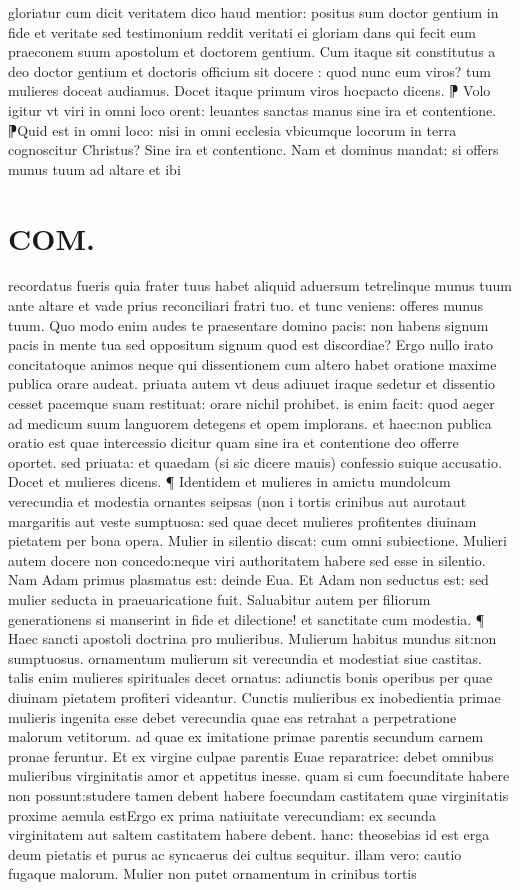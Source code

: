 \documentclass{article}
\begin{document}
\begin{pages}
gloriatur cum dicit veritatem dico haud mentior: positus sum doctor gentium in fide et veritate  sed testimonium reddit veritati ei gloriam dans qui fecit eum praeconem suum  apostolum  et doctorem gentium. Cum itaque  sit constitutus a deo doctor gentium et doctoris officium sit docere : quod  nunc eum viros? tum mulieres doceat audiamus. Docet itaque  primum viros hocpacto    dicens. ⁋ Volo igitur vt viri in omni loco orent: leuantes sanctas manus sine ira et contentione. ⁋Quid est in omni loco: nisi in omni ecclesia vbicumque  locorum in terra cognoscitur Christus? Sine ira et contentionc. Nam et dominus mandat: si offers munus tuum ad altare et ibi  \pend
\section*{COM. }
\marginpar{[ p.2 ]}\pstart recordatus fueris quia frater tuus habet aliquid aduersum tetrelinque munus tuum ante altare et vade prius reconciliari fratri tuo. et tunc veniens: offeres munus tuum. Quo modo enim audes te praesentare domino pacis: non habens signum pacis in mente tua sed oppositum signum quod est discordiae? Ergo nullo irato concitatoque  animos neque  qui dissentionem cum altero habet oratione maxime publica orare audeat. priuata autem vt deus adiuuet iraque  sedetur et dissentio cesset pacemque  suam restituat: orare nichil prohibet. is enim facit: quod aeger ad medicum suum languorem detegens et opem implorans. et haec:non publica oratio est quae intercessio dicitur quam sine ira et contentione deo offerre oportet. sed priuata: et quaedam (si sic dicere mauis) confessio suique  accusatio. Docet et mulieres dicens. ¶ Identidem et mulieres in amictu mundolcum verecundia et modestia ornantes seipsas (non i tortis crinibus aut aurotaut margaritis aut veste sumptuosa: sed quae   decet mulieres profitentes diuinam pietatem per bona opera. Mulier in silentio discat:   cum omni subiectione. Mulieri autem docere non concedo:neque  viri authoritatem habere    sed esse in silentio. Nam Adam primus plasmatus est: deinde Eua. Et Adam non seductus   est: sed mulier seducta  in praeuaricatione fuit. Saluabitur autem per filiorum generationens   si manserint in fide et dilectione! et sanctitate cum modestia. ¶ Haec sancti apostoli doctrina pro mulieribus. Mulierum habitus mundus sit:non sumptuosus. ornamentum mulierum sit verecundia   et modestiat siue castitas. talis enim mulieres spirituales decet ornatus: adiunctis bonis operibus per quae diuinam pietatem profiteri videantur. Cunctis mulieribus ex inobedientia primae mulieris ingenita esse debet verecundia quae eas retrahat a perpetratione malorum vetitorum. ad quae ex imitatione primae parentis secundum carnem pronae feruntur. Et ex virgine  culpae parentis Euae reparatrice: debet omnibus mulieribus virginitatis amor et appetitus inesse. quam si cum foecunditate habere non possunt:studere tamen debent habere foecundam castitatem quae virginitatis proxime aemula estErgo ex prima natiuitate verecundiam: ex secunda virginitatem aut saltem castitatem habere debent. hanc: theosebias id est erga deum pietatis  et purus ac syncaerus dei cultus sequitur. illam vero: cautio fugaque  malorum. Mulier non putet ornamentum in crinibus tortis 
\end{pages}
\end{document}
